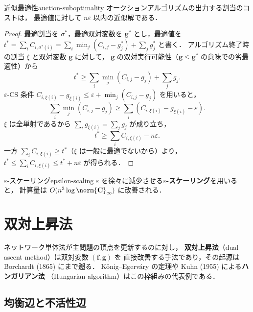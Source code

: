 \begin{proposition}{近似最適性}{auction-suboptimality}
  オークションアルゴリズムの出力する割当のコストは，
  最適値に対して $n\varepsilon$ 以内の近似解である．
\end{proposition}

\begin{proof}
  最適割当を $\sigma^*$，最適双対変数を $\mathbf{g}^*$ とし，最適値を
  $t^* = \sum_i C_{i,\sigma^*(i)} = \sum_i \min_j (C_{i,j} - g^*_j) + \sum_j g^*_j$
  と書く．
  アルゴリズム終了時の割当 $\xi$ と双対変数 $\mathbf{g}$ に対して，
  $\mathbf{g}$ の双対実行可能性（$\mathbf{g} \leq \mathbf{g}^*$ の意味での劣最適性）から
  \[
    t^* \geq \sum_i \min_j (C_{i,j} - g_j) + \sum_j g_j.
  \]
  $\varepsilon$-CS 条件 $C_{i,\xi(i)} - g_{\xi(i)} \leq \varepsilon + \min_j (C_{i,j} - g_j)$ を用いると，
  \[
    \sum_i \min_j (C_{i,j} - g_j)
    \geq \sum_i \left( C_{i,\xi(i)} - g_{\xi(i)} - \varepsilon \right).
  \]
  $\xi$ は全単射であるから $\sum_i g_{\xi(i)} = \sum_j g_j$ が成り立ち，
  \[
    t^* \geq \sum_i C_{i,\xi(i)} - n\varepsilon.
  \]
  一方 $\sum_i C_{i,\xi(i)} \geq t^*$（$\xi$ は一般に最適でないから）より，
  $t^* \leq \sum_i C_{i,\xi(i)} \leq t^* + n\varepsilon$ が得られる．
\end{proof}

\begin{remark}{$\varepsilon$-スケーリング}{epsilon-scaling}
  $\varepsilon$ を徐々に減少させる\textbf{$\varepsilon$-スケーリング}を用いると，
  計算量は $O(n^3 \log \norm{\mathbf{C}}_\infty)$ に改善される．
\end{remark}

\section{双対上昇法}
\label{sec:dual-ascent}

ネットワーク単体法が主問題の頂点を更新するのに対し，
\textbf{双対上昇法}（dual ascent method）は双対変数 $(\mathbf{f}, \mathbf{g})$ を
直接改善する手法であり，その起源は Borchardt (1865) にまで遡る．
K\"{o}nig--Egerv\'{a}ry の定理や Kuhn (1955) による\textbf{ハンガリアン法}
（Hungarian algorithm）はこの枠組みの代表例である．

\subsection{均衡辺と不活性辺}


